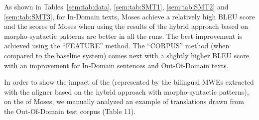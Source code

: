 \documentclass[output=paper,modfonts,nonflat]{langsci/langscibook}
\begin{document}
\begin{table}

\caption{BLEU scores of Moses when using the results of the hybrid approach based on linear programming and using a bilingual dictionary}
\label{sem:tab:SMT4}
\end{table}

As shown in Tables~\ref{sem:tab:data}, \ref{sem:tab:SMT1}, \ref{sem:tab:SMT2} and \ref{sem:tab:SMT3}, for In-Domain texts, Moses achieve a relatively high BLEU score and the scores of Moses when using the results of the hybrid approach based on morpho-syntactic patterns are better in all the runs. The best improvement is achieved using the ``FEATURE'' method. %
The ``CORPUS'' method (when compared to the baseline system) comes next with a slightly higher BLEU score with an improvement %
for In-Domain sentences and %
Out-Of-Domain texts.

In order to show the impact of the  (represented by the bilingual MWEs extracted with the aligner based on the hybrid approach with morpho-syntactic patterns), on the  of Moses, we manually analyzed an example of translations drawn from the Out-Of-Domain test corpus (Table 11).
\end{document}
